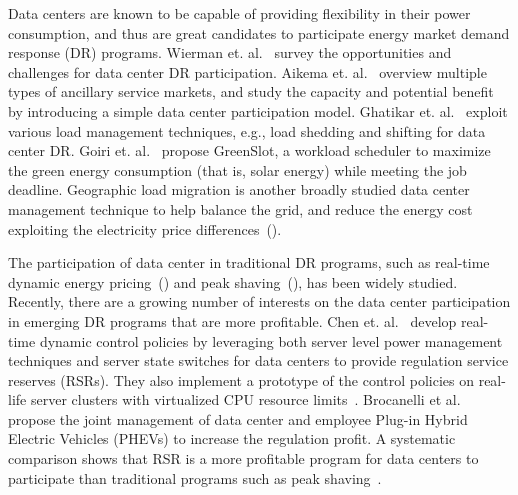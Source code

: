 Data centers are known to be capable of providing flexibility in their power consumption, and thus are great candidates to participate energy market demand response (DR) programs. Wierman et. al.~\cite{WiermanIGCC} survey the opportunities and challenges for data center DR participation. Aikema et. al.~\cite{aikema2012data} overview multiple types of ancillary service markets, and study the capacity and potential benefit by introducing a simple data center participation model. Ghatikar et. al.~\cite{ghatikar2012demand} exploit various load management techniques, e.g., load shedding and shifting for data center DR. Goiri et. al.~\cite{goiri2015matching} propose GreenSlot, a workload scheduler to maximize the green energy consumption (that is, solar energy) while meeting the job deadline. Geographic load migration is another broadly studied data center management technique to help balance the grid, and reduce the energy cost exploiting the electricity price differences~(\cite{wangexploring,wang2013data,chiu2012electric,liu2011greening,lin2012online}). 

The participation of data center in traditional DR programs, such as real-time dynamic energy pricing~(\cite{wang2013sequential,ghamkhari2012data,liu2014pricing}) and peak shaving~(\cite{urgaonkar2011optimal,PSUSigmetrics12,aksanli2013architecting}), has been widely studied. Recently, there are a growing number of interests on the data center participation in emerging DR programs that are more profitable. Chen et. al.~\cite{chenASPDAC} develop real-time dynamic control policies by leveraging both server level power management techniques and server state switches for data centers to provide regulation service reserves (RSRs). They also implement a prototype of the control policies on real-life server clusters with virtualized CPU resource limits~\cite{chendynamic}. Brocanelli et al.~\cite{brocanelli2013joint} propose the joint management of data center and employee Plug-in Hybrid Electric Vehicles (PHEVs) to increase the regulation profit. A systematic comparison shows that RSR is a more profitable program for data centers to participate than traditional programs such as peak shaving~\cite{chenIGCC}. 


